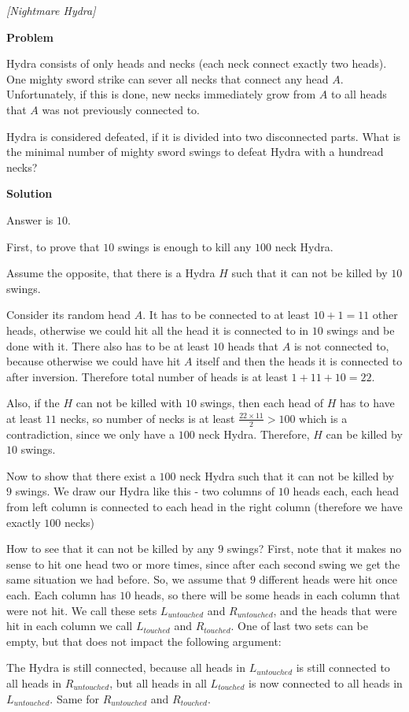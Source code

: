 \begin{problem}
\textit{[Nightmare Hydra]}

\textbf{Problem}

Hydra consists of only heads and necks (each neck connect exactly two heads). One mighty sword strike can sever all necks that connect any head $A$. Unfortunately, if this is done, new necks immediately grow from $A$ to all heads that $A$ was not previously connected to.

Hydra is considered defeated, if it is divided into two disconnected parts. What is the minimal number of mighty sword swings to defeat Hydra with a hundread necks?

\textbf{Solution}

Answer is $10$.

First, to prove that $10$ swings is enough to kill any $100$ neck Hydra. 

Assume the opposite, that there is a Hydra $H$ such that it can not be killed by $10$ swings. 

Consider its random head $A$. It has to be connected to at least $10+1=11$ other heads, otherwise we could hit all the head it is connected to in $10$ swings and be done with it. There also has to be at least $10$ heads that $A$ is not connected to, because otherwise we could have hit $A$ itself and then the heads it is connected to after inversion. Therefore total number of heads is at least $1+11+10=22$.

Also, if the $H$ can not be killed with $10$ swings, then each head of $H$ has to have at least $11$ necks, so number of necks is at least $\frac{22\times 11}{2}>100$ which is a contradiction, since we only have a $100$ neck Hydra. Therefore, $H$ can be killed by $10$ swings.

Now to show that there exist a $100$ neck Hydra such that it can not be killed by $9$ swings. 
We draw our Hydra like this - two columns of $10$ heads each, each head from left column is connected to each head in the right column (therefore we have exactly $100$ necks)

How to see that it can not be killed by any $9$ swings? 
First, note that it makes no sense to hit one head two or more times, since after each second swing we get the same situation we had before. So, we assume that $9$ different heads were hit once each. Each column has $10$ heads, so there will be some heads in each column that were not hit. We call these sets $L_{untouched}$ and $R_{untouched}$, and the heads that were hit in each column we call $L_{touched}$ and $R_{touched}$. One of last two sets can be empty, but that does not impact the following argument:

The Hydra is still connected, because all heads in $L_{untouched}$ is still connected to all heads in $R_{untouched}$, but all heads in all $L_{touched}$ is now connected to all heads in $L_{untouched}$. Same for $R_{untouched}$ and $R_{touched}$.
\end{problem}
%

